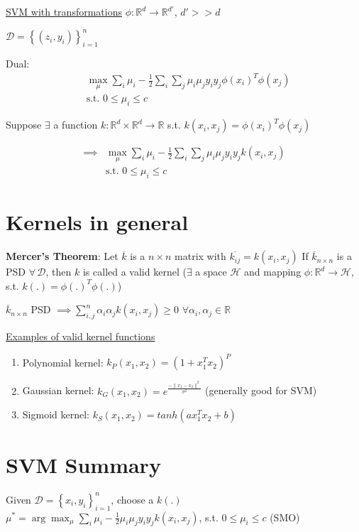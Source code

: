 \documentclass[11pt]{article}
\begin{document}
\uline{SVM with transformations}
\(\phi: \mathbb{R}^d \rightarrow \mathbb{R}^{d'}\), \(d' >> d\)

\(\mathcal{D} = \left\{ (z_i, y_i) \right\}_{i=1}^n\)

Dual:
\begin{align*}
&\max_{\mu} \sum_i \mu_i - \frac{1}{2} \sum_i\sum_j \mu_i\mu_j y_iy_j \phi(x_i)^T\phi(x_j) \\
&\text{s.t. } 0 \leq \mu_i \leq c
\end{align*}

Suppose \(\exists\) a function \(k: \mathbb{R}^d \times \mathbb{R}^d \rightarrow \mathbb{R}\) s.t. \(k(x_i, x_j) = \phi(x_i)^T\phi(x_j)\)

\begin{align*}
\implies &\max_{\mu} \sum_i \mu_i - \frac{1}{2} \sum_i\sum_j \mu_i\mu_j y_iy_j k(x_i, x_j) \\
&\text{s.t. } 0 \leq \mu_i \leq c
\end{align*}

\section{Kernels in general}
\label{sec:org393e472}
\textbf{Mercer's Theorem}: Let \(\overline{k}\) is a \(n \times n\) matrix with \(\overline{k_{ij}} = k(x_i, x_j)\)
If \(\overline{k}_{n \times n}\) is a PSD \(\forall \,\mathcal{D}\), then \(k\) is called a valid kernel
(\(\exists\) a space \(\mathcal{H}\) and mapping \(\phi: \mathbb{R}^d \rightarrow \mathcal{H}\), s.t. \(k(.) = \phi(.)^T\phi(.)\))

\(\overline{k}_{n \times n}\) PSD \(\implies \sum_{i,j}^n \alpha_i\alpha_j k(x_i, x_j) \geq 0\) \(\forall \alpha_i, \alpha_j \in \mathbb{R}\)

\uline{Examples of valid kernel functions}
\begin{enumerate}
\item Polynomial kernel: \(k_P(x_1, x_2) = (1 + x_1^Tx_2)^P\)
\item Gaussian kernel: \(k_G(x_1, x_2) = e^{\frac{-\lVert x_1 - x_2 \rVert^2}{\sigma^{2}}}\) (generally good for SVM)
\item Sigmoid kernel: \(k_S(x_1, x_2) = tanh(ax_1^Tx_2 + b)\)
\end{enumerate}

\section{SVM Summary}
\label{sec:orga29a923}
Given \(\mathcal{D} = \left\{ x_i, y_i \right\}_{i=1}^n\), choose a \(k(.)\)
\(\mu^{*} = \arg\max_{\mu} \sum_i\mu_i - \frac{1}{2}\mu_i\mu_j y_iy_j k(x_i, x_j)\), s.t. \(0 \leq \mu_i \leq c\) (SMO)
\end{document}
